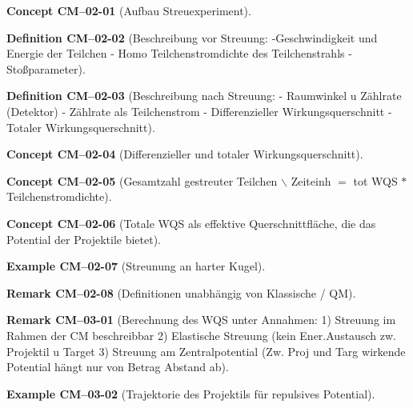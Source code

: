 \documentclass[10pt, letterpaper]{article}
\newcommand{\CustomHeading}[3]{%
  \par\medskip\noindent%
  \textbf{#1 #2} \textnormal{(#3)}.\enskip%
}
\newenvironment{DEF}[2]{\CustomHeading{Definition}{#1}{#2}}{}
\newenvironment{REM}[2]{\CustomHeading{Remark}{#1}{#2}}{}
\newenvironment{EXA}[2]{\CustomHeading{Example}{#1}{#2}}{}
\newenvironment{CONC}[2]{\CustomHeading{Concept}{#1}{#2}}{}
\begin{document}
\begin{CONC}{CM--02-01}{Aufbau Streuexperiment}
\end{CONC}

\begin{DEF}{CM--02-02}{Beschreibung vor Streuung:
-Geschwindigkeit und Energie der Teilchen
- Homo Teilchenstromdichte des Teilchenstrahls
- Stoßparameter}
\end{DEF}

\begin{DEF}{CM--02-03}{Beschreibung nach Streuung:
- Raumwinkel u Zählrate (Detektor)
- Zählrate als Teilchenstrom
- Differenzieller Wirkungsquerschnitt
- Totaler Wirkungsquerschnitt}
\end{DEF}

\begin{CONC}{CM--02-04}{Differenzieller und totaler Wirkungsquerschnitt}
\end{CONC}

\begin{CONC}{CM--02-05}{Gesamtzahl gestreuter Teilchen $\backslash$ Zeiteinh $=$ tot WQS $*$ Teilchenstromdichte}
\end{CONC}

\begin{CONC}{CM--02-06}{Totale WQS als effektive Querschnittfläche, die das Potential der Projektile bietet}
\end{CONC}

\begin{EXA}{CM--02-07}{Streunung an harter Kugel}
\end{EXA}

\begin{REM}{CM--02-08}{Definitionen unabhängig von Klassische / QM}
\end{REM}

\begin{REM}{CM--03-01}{Berechnung des WQS unter Annahmen:
1) Streuung im Rahmen der CM beschreibbar
2) Elastische Streuung (kein Ener.Austausch zw. Projektil u Target
3) Streuung am Zentralpotential (Zw. Proj und Targ wirkende Potential hängt nur von Betrag Abstand ab}
\end{REM}

\begin{EXA}{CM--03-02}{Trajektorie des Projektils für repulsives Potential}
\end{EXA}
\end{document}
